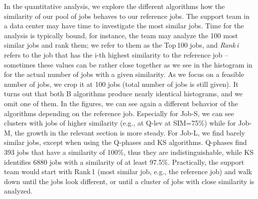 \documentclass{jhps}
\begin{document}
In the quantitative analysis, we explore the different algorithms how the similarity of our pool of jobs behaves to our reference jobs.
The support team in a data center may have time to investigate the most similar jobs.
Time for the analysis is typically bound, for instance, the team may analyze the 100 most similar jobs and rank them; we refer to them as the Top\,100 jobs, and \textit{Rank\,i} refers to the job that has the i-th highest similarity to the reference job -- sometimes these values can be rather close together as we see in the histogram in
 for the actual number of jobs with a given similarity.
As we focus on a feasible number of jobs, we crop it at 100 jobs (total number of jobs is still given).
It turns out that both B algorithms produce nearly identical histograms, and we omit one of them.
In the figures, we can see again a different behavior of the algorithms depending on the reference job.
Especially for Job-S, we can see clusters with jobs of higher similarity (e.g., at Q-lev at SIM=75\%) while for Job-M, the growth in the relevant section is more steady.
For Job-L, we find barely similar jobs, except when using the Q-phases and KS algorithms.
Q-phases find 393 jobs that have a similarity of 100\%, thus they are indistinguishable, while KS identifies 6880 jobs with a similarity of at least 97.5\%.
Practically, the support team would start with Rank\,1 (most similar job, e.g., the reference job) and walk down until the jobs look different, or until a cluster of jobs with close similarity is analyzed.

%
%
%
\end{document}
